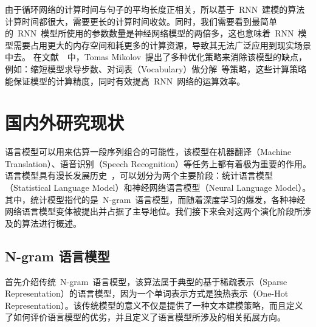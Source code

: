 由于循环网络的计算时间与句子的平均长度正相关，所以基于~RNN~建模的算法计算时间都很大，需要更长的计算时间收敛。同时，我们需要看到最简单的~RNN~模型所使用的参数数量是神经网络模型的两倍多，这也意味着~RNN~模型需要占用更大的内存空间和耗更多的计算资源，导致其无法广泛应用到现实场景中去。
在文献~\cite{DBLP:conf/icassp/MikolovKBCK11}~中，Tomas Mikolov~提出了多种优化策略来消除该模型的缺点，例如：缩短模型求导步数、对词表（Vocabulary）做分解~等策略，这些计算策略能保证模型的计算精度，同时有效提高~RNN~网络的运算效率。

\section{国内外研究现状}
语言模型可以用来估算一段序列组合的可能性，该模型在机器翻译（Machine Translation）、语音识别（Speech Recognition）等任务上都有着极为重要的作用。语言模型具有漫长发展历史~，可以划分为两个主要阶段：统计语言模型（Statistical Language Model）和神经网络语言模型（Neural Language Model）。
其中，统计模型指代的是~N-gram~语言模型，而随着深度学习的爆发，各种神经网络语言模型变体被提出并占据了主导地位。我们接下来会对这两个演化阶段所涉及的算法进行概述。

\subsection{N-gram 语言模型}
首先介绍传统~N-gram~语言模型，该算法属于典型的基于稀疏表示（Sparse Representation）的语言模型，因为一个单词表示方式是独热表示（One-Hot Representation）。该传统模型的意义不仅是提供了一种文本建模策略，而且定义了如何评价语言模型的优劣，并且定义了语言模型所涉及的相关拓展方向。

